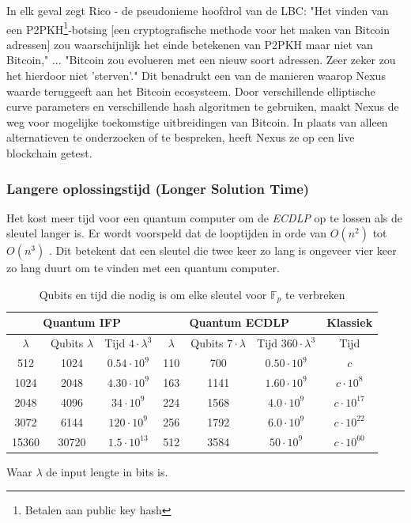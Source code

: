 \documentclass[11pt]{article}
\begin{document}
\noindent In elk geval zegt Rico - de pseudonieme hoofdrol van de LBC: "Het vinden van een P2PKH\footnote{Betalen aan public key hash\cite{p2pkh}}-botsing [een cryptografische methode voor het maken van Bitcoin adressen] zou waarschijnlijk het einde betekenen van P2PKH maar niet van Bitcoin," ... "Bitcoin zou evolueren met een nieuw soort adressen. Zeer zeker zou het hierdoor niet 'sterven'."\cite{largebitcoin}
Dit benadrukt een van de manieren waarop Nexus waarde teruggeeft aan het Bitcoin ecosysteem. Door verschillende elliptische curve parameters en verschillende hash algoritmen te gebruiken, maakt Nexus de weg voor mogelijke toekomstige uitbreidingen van Bitcoin. In plaats van alleen alternatieven te onderzoeken of te bespreken, heeft Nexus ze op een live blockchain getest.

\subsubsection*{Langere oplossingstijd (Longer Solution Time)}

Het kost meer tijd voor een quantum computer om de \textit{ECDLP} op te lossen als de sleutel langer is.
Er wordt voorspeld dat de looptijden in orde van $O(n^2)$ tot $O(n^3)$ \cite{prooszalka,kayezalka}.
Dit betekent dat een sleutel die twee keer zo lang is ongeveer vier keer zo lang duurt om te vinden met een quantum computer.

\begin{table}[ht]
\caption{Qubits en tijd die nodig is om elke sleutel voor $\mathbb{F}_{p}$ te verbreken \cite{quantumattacks}}
\begin{center}
\begin{tabular}{|c|c|c||c|c|c||c|}
    \hline
    \multicolumn{3}{|c||}{Quantum IFP} &
    \multicolumn{3}{c||}{Quantum ECDLP} &
    Klassiek \\
    \hline
    $\lambda$ & Qubits $\lambda$ & Tijd $4 \cdot \lambda ^ 3$ & $\lambda$ & Qubits $7 \cdot \lambda$ & Tijd $360 \cdot \lambda ^ 3$ & Tijd \\
    \hline
    \hline
    512 & 1024 & $0.54 \cdot 10^9$ & 
    110 & 700  & $0.50 \cdot 10^9$ & $c$ \\
    
    1024 & 2048 & $4.30 \cdot 10^9$ & 
    163  & 1141 & $1.60 \cdot 10^9$ & $c \cdot 10^8$ \\
    
    2048 & 4096 & $34 \cdot 10^9$ & 
    224  & 1568 & $4.0 \cdot 10^9$ & $c \cdot 10^{17}$ \\
    
    3072 & 6144 & $120 \cdot 10^9$ & 
    256 & 1792  & $6.0 \cdot 10^9$ & $c \cdot 10^{22}$ \\
    
    15360 & 30720 & $1.5 \cdot 10^{13}$ & 
    512   & 3584  & $50 \cdot 10^9$ & $c \cdot 10^{60}$ \\
    \hline
\end{tabular}
Waar $\lambda$ de input lengte in bits is.
\end{center}
\end{table}
\end{document}
